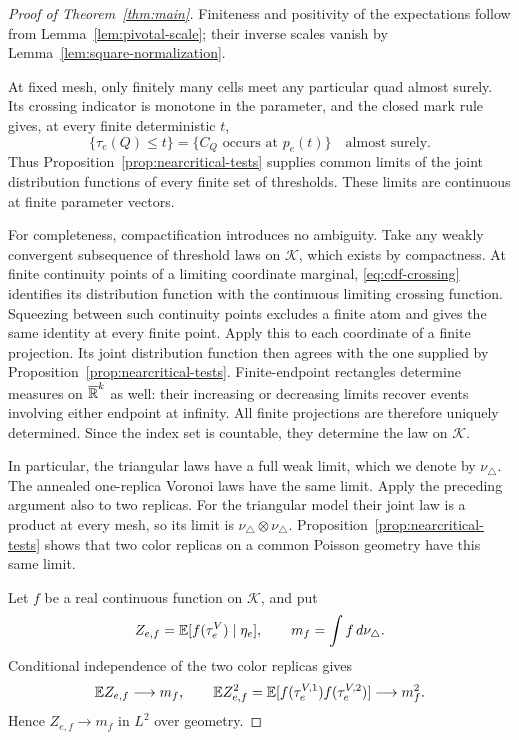 \begin{proof}[Proof of Theorem~\ref{thm:main}]
Finiteness and positivity of the expectations follow from
Lemma~\ref{lem:pivotal-scale}; their inverse scales vanish by
Lemma~\ref{lem:square-normalization}.

At fixed mesh, only finitely many cells meet any particular quad
almost surely. Its crossing indicator is monotone in the parameter,
and the closed mark rule gives, at every finite deterministic $t$,
\begin{equation}
 \{\tau_e(Q)\le t\}=\{C_Q\text{ occurs at }p_e(t)\}
 \quad\text{almost surely}.
 \label{eq:cdf-crossing}
\end{equation}
Thus Proposition~\ref{prop:nearcritical-tests} supplies common limits
of the joint distribution functions of every finite set of thresholds.
These limits are continuous at finite parameter vectors.

For completeness, compactification introduces no ambiguity.
Take any weakly convergent subsequence of threshold laws on $\mathcal K$,
which exists by compactness. At finite continuity points of a limiting
coordinate marginal, \eqref{eq:cdf-crossing} identifies its distribution
function with the continuous limiting crossing function. Squeezing
between such continuity points excludes a finite atom and gives the
same identity at every finite point. Apply this to each coordinate
of a finite projection. Its joint distribution function then agrees
with the one supplied by Proposition~\ref{prop:nearcritical-tests}.
Finite-endpoint rectangles determine measures on
$\overline{\mathbb R}^k$ as well: their increasing or decreasing limits recover
events involving either endpoint at infinity. All finite projections
are therefore uniquely determined. Since the index set is countable,
they determine the law on $\mathcal K$.

In particular, the triangular laws have a full weak limit, which we
denote by $\nu_\triangle$. The annealed one-replica Voronoi laws have
the same limit. Apply the preceding argument also to two replicas.
For the triangular model their joint law is a product at every mesh,
so its limit is $\nu_\triangle\otimes\nu_\triangle$. Proposition~\ref{prop:nearcritical-tests}
shows that two color replicas on a common Poisson geometry have
this same limit.

Let $f$ be a real continuous function on $\mathcal K$, and put
\[
 Z_{e,f}=\mathbb E[f(\tau_e^V)\mid\eta_e],
 \qquad m_f=\int f\,d\nu_\triangle.
\]
Conditional independence of the two color replicas gives
\[
 \mathbb E Z_{e,f}\longrightarrow m_f,
 \qquad
 \mathbb E Z_{e,f}^{2}
 =\mathbb E[f(\tau_e^{V,1})f(\tau_e^{V,2})]
 \longrightarrow m_f^2.
\]
Hence $Z_{e,f}\to m_f$ in $L^2$ over geometry.


\end{proof}
